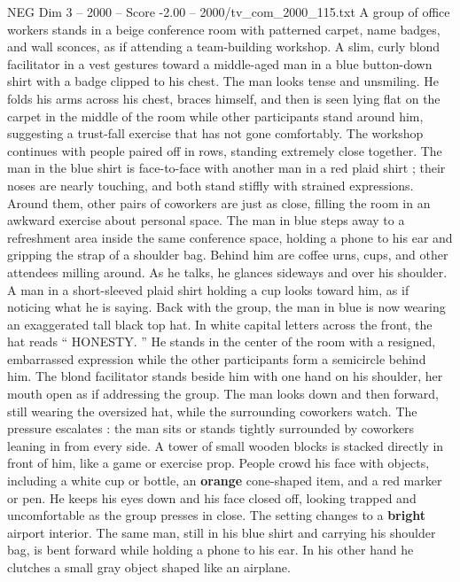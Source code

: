 \begin{textsample}{NEG Dim 3 – 2000 – Score -2.00 – 2000/tv\_com\_2000\_115.txt}  \label{ex:f3_neg_038}
A group of office workers stands in a beige conference room with patterned carpet, name badges, and wall sconces, as if attending a team-building workshop.
A slim, curly blond facilitator in a vest gestures toward a middle-aged man in a blue button-down shirt with a badge clipped to his chest.
The man looks tense and unsmiling.
He folds his arms across his chest, braces himself, and then is seen lying flat on the carpet in the middle of the room while other participants stand around him, suggesting a trust-fall exercise that has not gone comfortably.
The workshop continues with people paired off in rows, standing extremely close together.
The man in the blue shirt is face-to-face with another man in a red plaid shirt ; their noses are nearly touching, and both stand stiffly with strained expressions.
Around them, other pairs of coworkers are just as close, filling the room in an awkward exercise about personal space.
The man in blue steps away to a refreshment area inside the same conference space, holding a phone to his ear and gripping the strap of a shoulder bag.
Behind him are coffee urns, cups, and other attendees milling around.
As he talks, he glances sideways and over his shoulder.
A man in a short-sleeved plaid shirt holding a cup looks toward him, as if noticing what he is saying.
Back with the group, the man in blue is now wearing an exaggerated tall black top hat.
In white capital letters across the front, the hat reads “ HONESTY. ” He stands in the center of the room with a resigned, embarrassed expression while the other participants form a semicircle behind him.
The blond facilitator stands beside him with one hand on his shoulder, her mouth open as if addressing the group.
The man looks down and then forward, still wearing the oversized hat, while the surrounding coworkers watch.
The pressure escalates : the man sits or stands tightly surrounded by coworkers leaning in from every side.
A tower of small wooden blocks is stacked directly in front of him, like a game or exercise prop.
People crowd his face with objects, including a white cup or bottle, an \textbf{orange} cone-shaped item, and a red marker or pen.
He keeps his eyes down and his face closed off, looking trapped and uncomfortable as the group presses in close.
The setting changes to a \textbf{bright} airport interior.
The same man, still in his blue shirt and carrying his shoulder bag, is bent forward while holding a phone to his ear.
In his other hand he clutches a small gray object shaped like an airplane.

\end{textsample}
